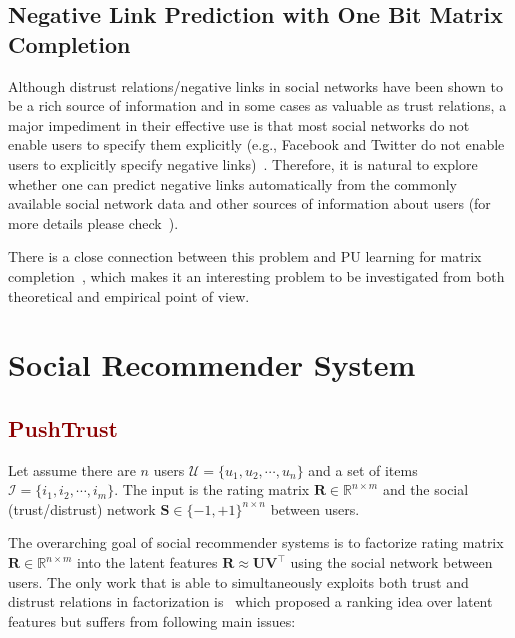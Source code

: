 \documentclass[11pt]{article}
\newcommand{\bR}{\mathbf{R}}
\newcommand{\bS}{\mathbf{S}}
\newcommand{\bU}{\mathbf{U}}
\newcommand{\bV}{\mathbf{V}}
\theoremstyle{definition}
\begin{document}
\subsection{Negative Link Prediction with One Bit Matrix Completion}

 Although distrust relations/negative links in social networks have been shown to be a rich source of information and in some cases as valuable as trust relations, a major impediment in their effective use is that most social networks  do not enable users to specify them explicitly (e.g., Facebook and Twitter do not enable users to explicitly specify negative links)~\cite{chiang2014prediction}.  Therefore, it is natural to explore whether one can predict negative links automatically from the commonly available social network data and other sources of information about  users (for more details please check~\cite{tang2014negative}). 

There is a close connection between this problem and PU learning for matrix completion~\cite{hsieh2014pu}, which makes it an interesting problem to be investigated from both theoretical and empirical point of view. 

\section{Social Recommender System}

\subsection{\textcolor{DarkRed}{PushTrust}}

Let assume there are $n$ users $\mathcal{U} = \{u_1, u_2, \cdots, u_n\}$ and a set of items $\mathcal{I} = \{i_1, i_2, \cdots, i_m\}$. The input is the rating matrix $\bR \in \mathbb{R}^{n \times m}$ and the social (trust/distrust) network $\bS \in \{-1, +1\}^{n\times n}$ between users.

The overarching goal of social recommender systems  is to factorize rating matrix $\bR \in \mathbb{R}^{n \times m}$ into the latent features $\bR \approx \bU \bV^{\top}$ using the social network between users. The only work that is able to simultaneously exploits both trust and distrust relations in factorization is~\cite{forsati2014matrix} which proposed a ranking idea over latent features but suffers from following  main issues:
\end{document}
